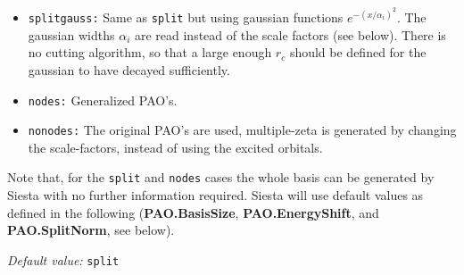 \documentclass[11pt]{article}
\begin{document}
\begin{description}
\begin{itemize}
\item {\tt splitgauss:}
Same as {\tt split} but using gaussian functions
$e^{-(x/\alpha_i)^2}$. The gaussian widths $\alpha_i$ are read instead
of the scale factors (see below). There is no cutting algorithm, so that
a large enough $r_c$ should be defined for the gaussian to have decayed
sufficiently.

\item {\tt nodes:} Generalized PAO's.

\item {\tt nonodes:}
The original PAO's are used, multiple-zeta is generated
by changing the scale-factors, instead of using the excited orbitals.

\end{itemize}

\noindent
Note that, for the {\tt split} and {\tt nodes} cases
the whole basis can be generated by {\sc Siesta} with no further information
required. {\sc Siesta} will use default values as defined in the following
({\bf PAO.BasisSize},
{\bf PAO.EnergyShift}, and {\bf PAO.SplitNorm}, see below).

{\it Default value:} {\tt split}

\end{description}
\end{document}
